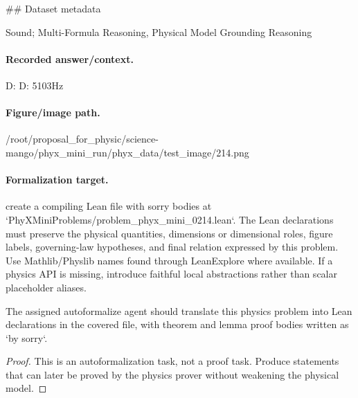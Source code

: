 \#\# Dataset metadata

Sound; Multi-Formula Reasoning, Physical Model Grounding Reasoning

\paragraph{Recorded answer/context.}
D: D: 5103Hz

\paragraph{Figure/image path.}
/root/proposal\_for\_physic/science-mango/phyx\_mini\_run/phyx\_data/test\_image/214.png

\paragraph{Formalization target.}
create a compiling Lean file with sorry bodies at `PhyXMiniProblems/problem\_phyx\_mini\_0214.lean`. The Lean declarations must preserve the physical quantities, dimensions or dimensional roles, figure labels, governing-law hypotheses, and final relation expressed by this problem.
Use Mathlib/Physlib names found through LeanExplore where available. If a physics API is missing, introduce faithful local abstractions rather than scalar placeholder aliases.

\begin{theorem}
\label{thm:physics:phyx_mini_0214:target}
The assigned autoformalize agent should translate this physics problem into Lean declarations in the covered file, with theorem and lemma proof bodies written as `by sorry`.
\end{theorem}
\begin{proof}
This is an autoformalization task, not a proof task. Produce statements that can later be proved by the physics prover without weakening the physical model.
\end{proof}

